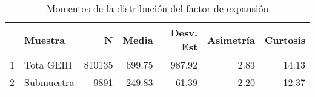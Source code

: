 \begin{table}[H]
\centering
\begin{tabular}{rlrrrrr}
  \toprule
 & Muestra & N & Media & Desv. Est & Asimetría & Curtosis \\ 
  \midrule
1 & Tota GEIH & 810135 & 699.75 & 987.92 & 2.83 & 14.13 \\ 
  2 & Submuestra & 9891 & 249.83 & 61.39 & 2.20 & 12.37 \\ 
   \bottomrule
\end{tabular}
\caption{Momentos de la distribución del factor de expansión} 
\end{table}
